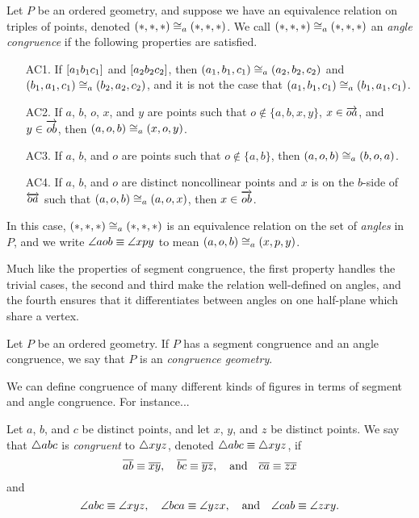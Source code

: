\begin{dfn}
Let \(P\) be an ordered geometry, and suppose we have an equivalence relation on triples of points, denoted \((\ast,\ast,\ast) \cong_a (\ast,\ast,\ast)\).
We call \((\ast,\ast,\ast) \cong_a (\ast,\ast,\ast)\) an \emph{angle congruence} if the following properties are satisfied.
\begin{itemize}
\item[AC1.] If \([ a_1 b_1 c_1 ]\) and \([ a_2 b_2 c_2 ]\), then \((a_1,b_1,c_1) \cong_a (a_2,b_2,c_2)\) and \((b_1,a_1,c_1) \cong_a (b_2,a_2,c_2)\), and it is not the case that \((a_1,b_1,c_1) \cong_a (b_1,a_1,c_1)\).
\item[AC2.] If \(a\), \(b\), \(o\), \(x\), and \(y\) are points such that \(o \notin \{a,b,x,y\}\), \(x \in \overrightarrow{oa}\), and \(y \in \overrightarrow{ob}\), then \((a,o,b) \cong_a (x,o,y)\).
\item[AC3.] If \(a\), \(b\), and \(o\) are points such that \(o \notin \{a,b\}\), then \((a,o,b) \cong_a (b,o,a)\).
\item[AC4.] If \(a\), \(b\), and \(o\) are distinct noncollinear points and \(x\) is on the \(b\)-side of \(\overleftrightarrow{oa}\) such that \((a,o,b) \cong_a (a,o,x)\), then \(x \in \overrightarrow{ob}\).
\end{itemize}
In this case, \((\ast,\ast,\ast) \cong_a (\ast,\ast,\ast)\) is an equivalence relation on the set of \emph{angles} in \(P\), and we write \(\angle{aob} \equiv \angle{xpy}\) to mean \((a,o,b) \cong_a (x,p,y)\).
\end{dfn}

Much like the properties of segment congruence, the first property handles the trivial cases, the second and third make the relation well-defined on angles, and the fourth ensures that it differentiates between angles on one half-plane which share a vertex.

\begin{dfn}
Let \(P\) be an ordered geometry.
If \(P\) has a segment congruence and an angle congruence, we say that \(P\) is an \emph{congruence geometry}.
\end{dfn}

We can define congruence of many different kinds of figures in terms of segment and angle congruence.
For instance...

\begin{dfn}
Let \(a\), \(b\), and \(c\) be distinct points, and let \(x\), \(y\), and \(z\) be distinct points.
We say that \(\bigtriangleup{abc}\) is \emph{congruent} to \(\bigtriangleup{xyz}\), denoted \(\bigtriangleup{abc} \equiv \bigtriangleup{xyz}\), if \[ \overline{ab} \equiv \overline{xy}, \quad \overline{bc} \equiv \overline{yz}, \quad \mathrm{and} \quad \overline{ca} \equiv \overline{zx} \] and \[ \angle{abc} \equiv \angle{xyz}, \quad \angle{bca} \equiv \angle{yzx}, \quad \mathrm{and} \quad \angle{cab} \equiv \angle{zxy}. \]
\end{dfn}

